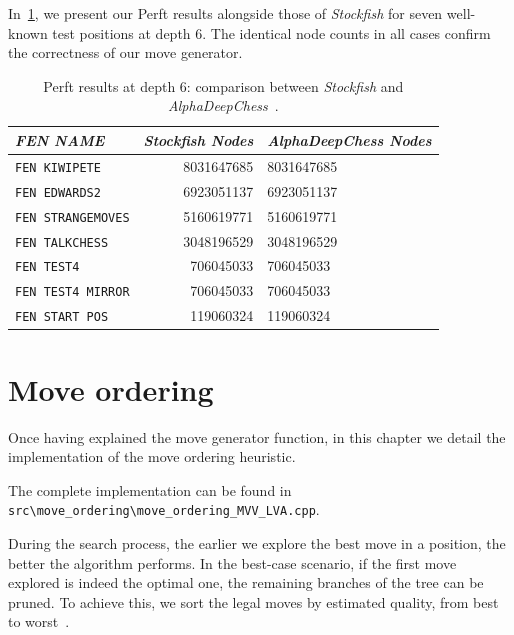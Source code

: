 \noindent In~\cref{tab:perftResults}, we present our Perft results alongside those of \textit{Stockfish} for seven well-known test positions at depth 6. The identical node counts in all cases confirm the correctness of our move generator.

\begin{table}[H]
    \centering
    \begin{tabular}{|l|r|l|}
    \hline
    \textit{FEN NAME} & \textit{Stockfish Nodes} & \textit{AlphaDeepChess Nodes} \\
    \hline
    \texttt{FEN KIWIPETE}       &  8031647685 &  8031647685   \\
    \texttt{FEN EDWARDS2}       &  6923051137 &  6923051137   \\
    \texttt{FEN STRANGEMOVES}   &  5160619771 &  5160619771   \\
    \texttt{FEN TALKCHESS}      &  3048196529 &  3048196529   \\
    \texttt{FEN TEST4}          &  706045033  &  706045033    \\
    \texttt{FEN TEST4 MIRROR}   &  706045033  &  706045033    \\
    \texttt{FEN START POS}      &  119060324  &  119060324    \\
    \hline
    \end{tabular}
    \caption{Perft results at depth 6: comparison between \textit{Stockfish} and \textit{AlphaDeepChess}~\cite{PerftResults}.}\label{tab:perftResults}
\end{table}

\section{Move ordering}\label{cap:moveOrdering}
Once having explained the move generator function, in this chapter we detail the implementation of the move ordering heuristic.

\vspace{1em}

\noindent \parbox{\textwidth}{The complete implementation can be found in\\\texttt{src\textbackslash{}move\_ordering\textbackslash{}move\_ordering\_MVV\_LVA.cpp}.}

\vspace{1em}

\noindent During the search process, the earlier we explore the best move in a position, the better the algorithm performs. In the best-case scenario, if the first move explored is indeed the optimal one, the remaining branches of the tree can be pruned. To achieve this, we sort the legal moves by estimated quality, from best to worst~\cite{MoveOrdering}.

